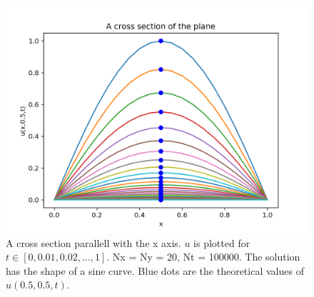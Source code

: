 \documentclass{article}
\begin{document}
\begin{figure}
  \includegraphics[width=\linewidth]{crosssection.png}
  \caption{A cross section parallell with the x axis. $u$ is plotted for $t \in [0,0.01, 0.02, ... , 1]$. Nx = Ny = 20, Nt = 100000. The solution has the shape of a sine curve. Blue dots are the theoretical values of $u(0.5,0.5,t)$.}
  \label{fig:crosssection}
\end{figure} 
\end{document}
